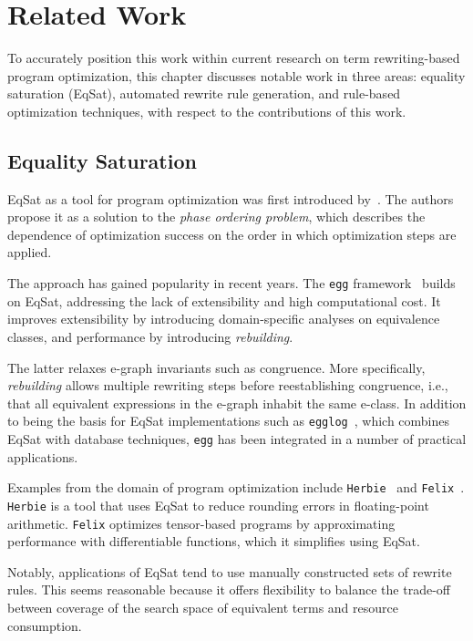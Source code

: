 \chapter{Related Work}

To accurately position this work within current research on term rewriting-based program optimization, this chapter discusses notable work in three areas: equality saturation (EqSat), automated rewrite rule generation, and rule-based optimization techniques, with respect to the contributions of this work.

\section{Equality Saturation}
EqSat as a tool for program optimization was first introduced by~\cite{Tate_2011}. The authors propose it as a solution to the \emph{phase ordering problem}, which describes the dependence of optimization success on the order in which optimization steps are applied. 

The approach has gained popularity in recent years. The \texttt{egg} framework~\citep{Willsey_2021} builds on EqSat, addressing the lack of extensibility and high computational cost. It improves extensibility by introducing domain-specific analyses on equivalence classes, and performance by introducing \emph{rebuilding}.

The latter relaxes e-graph invariants such as congruence. More specifically, \emph{rebuilding} allows multiple rewriting steps before reestablishing congruence, i.e., that all equivalent expressions in the e-graph inhabit the same e-class. In addition to being the basis for EqSat implementations such as \texttt{egglog}~\citep{zhang2023bettertogetherunifyingdatalog}, which combines EqSat with database techniques, \texttt{egg} has been integrated in a number of practical applications.

Examples from the domain of program optimization include \texttt{Herbie}~\citep{herbie} and \texttt{Felix}~\citep{Felix}. \texttt{Herbie} is a tool that uses EqSat to reduce rounding errors in floating-point arithmetic. \texttt{Felix} optimizes tensor-based programs by approximating performance with differentiable functions, which it simplifies using EqSat.

Notably, applications of EqSat tend to use manually constructed sets of rewrite rules. This seems reasonable because it offers flexibility to balance the trade-off between coverage of the search space of equivalent terms and resource consumption. 

